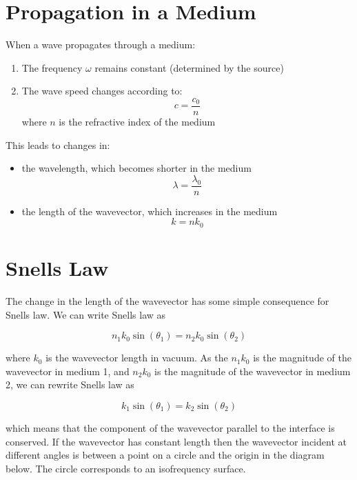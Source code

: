 \documentclass[
  a4paper,
]{book}
\providecommand{\tightlist}{%
  \setlength{\itemsep}{0pt}\setlength{\parskip}{0pt}}
\begin{document}
\section{Propagation in a Medium}\label{propagation-in-a-medium}

When a wave propagates through a medium:

\begin{enumerate}
\def\labelenumi{\arabic{enumi}.}
\tightlist
\item
  The frequency \(\omega\) remains constant (determined by the source)
\item
  The wave speed changes according to: \[
  c=\frac{c_0}{n}
  \] where \(n\) is the refractive index of the medium
\end{enumerate}

This leads to changes in:

\begin{itemize}
\item
  the wavelength, which becomes shorter in the medium \[
  \lambda=\frac{\lambda_0}{n}
  \]
\item
  the length of the wavevector, which increases in the medium \[
  k=nk_0
  \]
\end{itemize}

\section{Snells Law}\label{snells-law-1}

The change in the length of the wavevector has some simple consequence
for Snells law. We can write Snells law as

\[
n_1k_0\sin(\theta_1)=n_2k_0\sin(\theta_2)
\]

where \(k_0\) is the wavevector length in vacuum. As the \(n_1k_0\) is
the magnitude of the wavevector in medium 1, and \(n_2k_0\) is the
magnitude of the wavevector in medium 2, we can rewrite Snells law as

\[
k_1\sin(\theta_1)=k_2\sin(\theta_2)
\]

which means that the component of the wavevector parallel to the
interface is conserved. If the wavevector has constant length then the
wavevector incident at different angles is between a point on a circle
and the origin in the diagram below. The circle corresponds to an
isofrequency surface.
\end{document}
